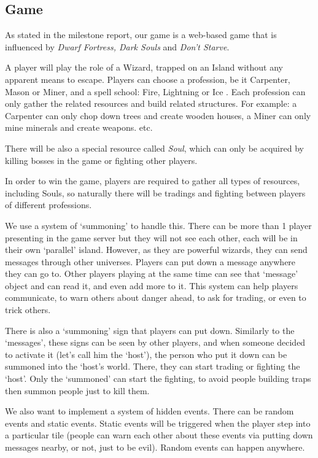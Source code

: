 \documentclass[a4wide, 11pt]{article}
\begin{document}
\subsection{Game}

As stated in the milestone report, our game is a web-based game that is influenced by \textit{Dwarf Fortress, Dark Souls} and \textit{Don’t Starve}.

A player will play the role of a Wizard, trapped on an Island without any apparent means to escape. Players can choose a profession, be it Carpenter, Mason or Miner, and a spell school: Fire, Lightning or Ice . Each profession can only gather the related resources and build related structures. For example: a Carpenter can only chop down trees and create wooden houses, a Miner can only mine minerals and create weapons. etc.

There will be also a special resource called \textit{Soul}, which can only be acquired by killing bosses in the game or fighting other players.

In order to win the game, players are required to gather all types of resources, including Souls, so naturally there will be tradings and fighting between players of different professions.

We use a system of ‘summoning’ to handle this. There can be more than 1 player presenting in the game server but they will not see each other, each will be in their own ‘parallel’ island. However, as they are powerful wizards, they can send messages through other universes. Players can put down a message anywhere they can go to. Other players playing at the same time can see that ‘message’ object and can read it, and even add more to it. This system can help players communicate, to warn others about danger ahead, to ask for trading, or even to trick others.

There is also a ‘summoning’ sign that players can put down. Similarly to the ‘messages’, these signs can be seen by other players, and when someone decided to activate it (let’s call him the ‘host’), the person who put it down can be summoned into the ‘host’s world. There, they can start trading or fighting the ‘host’. Only the ‘summoned’ can start the fighting, to avoid people building traps then summon people just to kill them.

We also want to implement a system of hidden events. There can be random events and static events. Static events will be triggered when the player step into a particular tile (people can warn each other about these events via putting down messages nearby, or not, just to be evil). Random events can happen anywhere.
\end{document}

